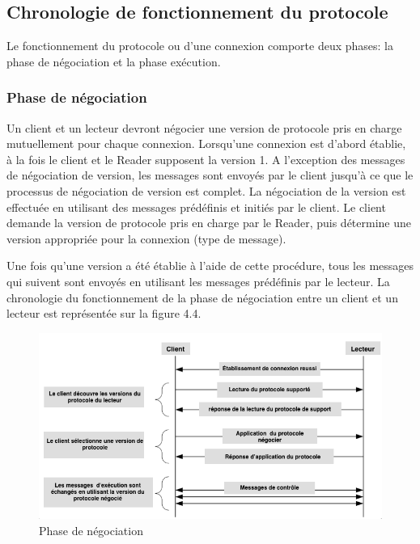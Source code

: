 \documentclass[11pt, a4paper, twoside]{book}
\begin{document}
\subsection{Chronologie de fonctionnement du protocole}
Le fonctionnement du protocole ou d'une connexion comporte deux phases: la phase de négociation et la phase exécution.
\subsubsection{Phase de négociation}
Un client et un lecteur devront négocier une version de protocole pris en charge mutuellement pour chaque connexion. Lorsqu'une connexion  est d'abord établie, à la fois le client et le Reader supposent  la version 1. A l'exception des messages de négociation de version, les messages sont envoyés par le client  jusqu'à ce que le processus de négociation de version est complet. La négociation de la version est effectuée en utilisant des messages prédéfinis et initiés par le client. Le client demande la version de protocole pris en charge par le Reader, puis détermine une version appropriée pour la connexion (type de message).
 
Une fois qu'une version a été établie à l'aide de cette procédure, tous les messages qui suivent sont envoyés en utilisant les messages prédéfinis par le lecteur. La chronologie du fonctionnement de la phase de négociation  entre un client et un lecteur est représentée sur la figure 4.4.
\begin{figure}[!h]
\centering
\includegraphics[width=\textwidth]{negotiation2}
\caption{Phase de négociation}
\end{figure}
\end{document}
